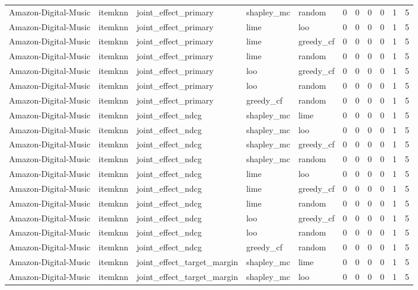\begin{table}[t]
{\begin{tabular}{lllllrrrrrr}
Amazon-Digital-Music & itemknn & joint\_effect\_primary & shapley\_mc & random & 0 & 0 & 0 & 0 & 1 & 5 \\
Amazon-Digital-Music & itemknn & joint\_effect\_primary & lime & loo & 0 & 0 & 0 & 0 & 1 & 5 \\
Amazon-Digital-Music & itemknn & joint\_effect\_primary & lime & greedy\_cf & 0 & 0 & 0 & 0 & 1 & 5 \\
Amazon-Digital-Music & itemknn & joint\_effect\_primary & lime & random & 0 & 0 & 0 & 0 & 1 & 5 \\
Amazon-Digital-Music & itemknn & joint\_effect\_primary & loo & greedy\_cf & 0 & 0 & 0 & 0 & 1 & 5 \\
Amazon-Digital-Music & itemknn & joint\_effect\_primary & loo & random & 0 & 0 & 0 & 0 & 1 & 5 \\
Amazon-Digital-Music & itemknn & joint\_effect\_primary & greedy\_cf & random & 0 & 0 & 0 & 0 & 1 & 5 \\
Amazon-Digital-Music & itemknn & joint\_effect\_ndcg & shapley\_mc & lime & 0 & 0 & 0 & 0 & 1 & 5 \\
Amazon-Digital-Music & itemknn & joint\_effect\_ndcg & shapley\_mc & loo & 0 & 0 & 0 & 0 & 1 & 5 \\
Amazon-Digital-Music & itemknn & joint\_effect\_ndcg & shapley\_mc & greedy\_cf & 0 & 0 & 0 & 0 & 1 & 5 \\
Amazon-Digital-Music & itemknn & joint\_effect\_ndcg & shapley\_mc & random & 0 & 0 & 0 & 0 & 1 & 5 \\
Amazon-Digital-Music & itemknn & joint\_effect\_ndcg & lime & loo & 0 & 0 & 0 & 0 & 1 & 5 \\
Amazon-Digital-Music & itemknn & joint\_effect\_ndcg & lime & greedy\_cf & 0 & 0 & 0 & 0 & 1 & 5 \\
Amazon-Digital-Music & itemknn & joint\_effect\_ndcg & lime & random & 0 & 0 & 0 & 0 & 1 & 5 \\
Amazon-Digital-Music & itemknn & joint\_effect\_ndcg & loo & greedy\_cf & 0 & 0 & 0 & 0 & 1 & 5 \\
Amazon-Digital-Music & itemknn & joint\_effect\_ndcg & loo & random & 0 & 0 & 0 & 0 & 1 & 5 \\
Amazon-Digital-Music & itemknn & joint\_effect\_ndcg & greedy\_cf & random & 0 & 0 & 0 & 0 & 1 & 5 \\
Amazon-Digital-Music & itemknn & joint\_effect\_target\_margin & shapley\_mc & lime & 0 & 0 & 0 & 0 & 1 & 5 \\
Amazon-Digital-Music & itemknn & joint\_effect\_target\_margin & shapley\_mc & loo & 0 & 0 & 0 & 0 & 1 & 5 \\

\end{tabular}}
\end{table}

